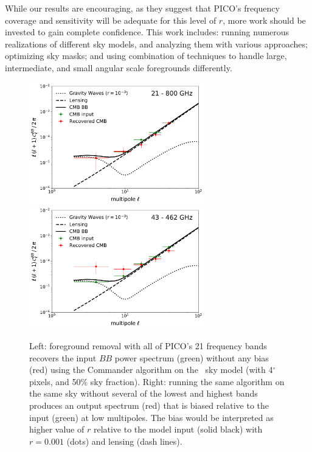 \documentclass[PICOReport.tex]{subfiles}
\begin{document}
While our results are encouraging, as they suggest that PICO's frequency coverage and sensitivity will be adequate for this level of $r$, more work should be invested to gain complete confidence. This work includes: running numerous realizations of different sky models, and analyzing them with various approaches; optimizing sky masks; and using combination of techniques to handle large, intermediate, and small angular scale foregrounds differently. 
\begin{figure}
\includegraphics[width=3in]{images/commander_pico_baseline.pdf}
\hspace{-0.0in}
\includegraphics[width=3in]{images/commander_pico_descoped.pdf}
\caption{\captiontext
Left: foreground removal with all of PICO's 21 frequency bands recovers the input $BB$ power spectrum (green) without any bias (red) using the Commander algorithm on the \planck\ sky model (with 4$^\circ$ pixels, and 50\% sky fraction). Right: running the same algorithm on the same sky without several of the lowest and highest bands produces an output spectrum (red) that is biased relative to the input (green) at low multipoles. The bias would be interpreted as higher value of $r$ relative to the model input (solid black) with $r=0.001$ (dots) and lensing (dash lines). 
\label{fig:commander}}
\vspace{-0.0in}
\end{figure}
\end{document}
